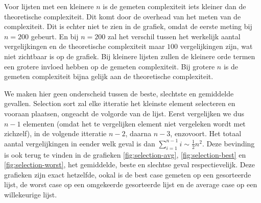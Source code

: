 \documentclass[a4paper]{article}
\begin{document}
\par

Voor lijsten met een kleinere $n$ is de gemeten complexiteit iets kleiner dan de theoretische complexiteit. Dit komt door de overhead van het meten van de complexiteit. Dit is echter niet te zien in de grafiek, omdat de eerste meting bij $n=200$ gebeurt.
En bij $n=200$ zal het verschil tussen het werkelijk aantal vergelijkingen en de theoretische complexiteit maar $100$ vergelijkingen zijn, wat niet zichtbaar is op de grafiek.
Bij kleinere lijsten zullen de kleinere orde termen een grotere invloed hebben op de gemeten complexiteit.
Bij grotere $n$ is de gemeten complexiteit bijna gelijk aan de theoretische complexiteit. 

\par

We maken hier geen onderscheid tussen de beste, slechtste en gemiddelde gevallen. Selection sort zal elke itteratie het kleinste element selecteren en vooraan plaatsen, ongeacht de volgorde van de lijst.
Eerst vergelijken we dus $n-1$ elementen (omdat het te vergelijken element niet vergeleken wordt met zichzelf), in de volgende itteratie $n-2$, daarna $n-3$, enzovoort. Het totaal aantal vergelijkingen in eender welk geval is dan $\sum_{i=1}^{n-1}i \sim \frac{1}{2}n^2$.
Deze bevinding is ook terug te vinden in de grafieken \ref{fig:selection-avg}, \ref{fig:selection-best} en \ref{fig:selection-worst}, het gemiddelde, beste en slechtse geval respectievelijk. Deze grafieken zijn exact hetzelfde, ookal is de best case gemeten op een gesorteerde lijst, de worst case op een omgekeerde gesorteerde lijst en de average case op een willekeurige lijst.
\end{document}
